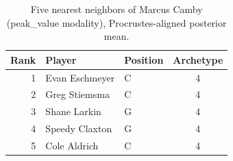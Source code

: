 \begin{table}[htbp]
  \centering\small
  \begin{tabular}{rllc}
    \toprule
    Rank & Player & Position & Archetype \\
    \midrule
    1 & Evan Eschmeyer & C & 4 \\
    2 & Greg Stiemsma & C & 4 \\
    3 & Shane Larkin & G & 4 \\
    4 & Speedy Claxton & G & 4 \\
    5 & Cole Aldrich & C & 4 \\
    \bottomrule
  \end{tabular}
  \caption{Five nearest neighbors of Marcus Camby (peak_value modality), Procrustes-aligned posterior mean.}
  \label{tab:Marcus_Camby_neighbors_peak_value}
\end{table}

